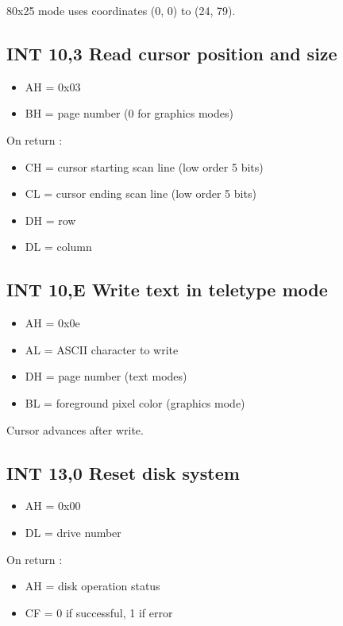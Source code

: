 80x25 mode uses coordinates (0, 0) to (24, 79).

\subsection{INT 10,3 Read cursor position and size}
\begin{itemize}
  \item{AH = 0x03}
  \item{BH = page number (0 for graphics modes)}
\end{itemize}

On return :

\begin{itemize}
  \item{CH = cursor starting scan line (low order 5 bits)}
  \item{CL = cursor ending scan line (low order 5 bits)}
  \item{DH = row}
  \item{DL = column}
\end{itemize}


\subsection{INT 10,E Write text in teletype mode}
\begin{itemize}
  \item{AH = 0x0e}
  \item{AL = ASCII character to write}
  \item{DH = page number (text modes)}
  \item{BL = foreground pixel color (graphics mode)}
\end{itemize}

Cursor advances after write.

%
%
\subsection{INT 13,0 Reset disk system}
\begin{itemize}
  \item{AH = 0x00}
  \item{DL = drive number}
\end{itemize}

On return :

\begin{itemize}
  \item{AH = disk operation status}
  \item{CF = 0 if successful, 1 if error}
\end{itemize}

